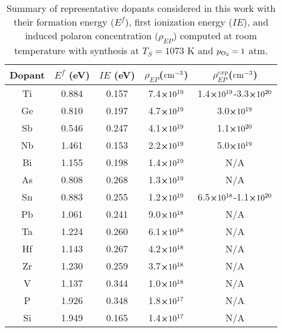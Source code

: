  \begin{table}[h]
\footnotesize
\centering
\begin{tabular}{c|cccc}
\hline \hline
Dopant & $E^f$ (eV) &  $IE$ (eV) &  $\rho_{EP}$(${\rm cm}^{-3}$) &  $\rho_{EP}^{exp}$(${\rm cm}^{-3}$)  \\
\hline
Ti &        0.884 &           0.157 &        7.4$\cross 10^{19}$ &  1.4$\cross 10^{19}$-3.3$\cross 10^{20}$ \cite{wang2011facile,rioult2014single,malviya2017influence,hahn2010photoelectrochemical,zandi2013highly,glasscock2007enhancement}\\
Ge &        0.810 &           0.197 &        4.7$\cross 10^{19}$ &  3.0$\cross 10^{19}$ \cite{liu2014highly}\\
Sb &        0.546 &           0.247 &        4.1$\cross 10^{19}$ &  1.1$\cross 10^{20}$ \cite{annamalai2018influence}\\
Nb &        1.461 &           0.153 &        2.2$\cross 10^{19}$ &  5.0$\cross 10^{19}$ \cite{sanchez1988photoelectrochemistry} \\
Bi &        1.155 &           0.198 &        1.4$\cross 10^{19}$ &  N/A\\
As &        0.808 &           0.268 &        1.3$\cross 10^{19}$ &  N/A\\
Sn &        0.883 &           0.255 &        1.2$\cross 10^{19}$ &  6.5$\cross 10^{18}$-1.1$\cross 10^{20}$ \cite{li2017morphology,tian2020electronic,ling2011sn,yang2016acid}\\
Pb &        1.061 &           0.241 &        9.0$\cross 10^{18}$ &  N/A\\
Ta &        1.224 &           0.260 &        6.1$\cross 10^{18}$ &  N/A\\
Hf &        1.143 &           0.267 &        4.2$\cross 10^{18}$ &  N/A\\
Zr &        1.230 &           0.259 &        3.7$\cross 10^{18}$ &  N/A\\
V &        1.137 &           0.344 &        1.0$\cross 10^{18}$ &  N/A\\
P &        1.926 &           0.348 &        1.8$\cross 10^{17}$ &  N/A\\
Si &        1.949 &           0.165 &        1.4$\cross 10^{17}$ &  N/A\\
\hline \hline
\end{tabular}
\caption{Summary of representative dopants considered in this work with their formation energy ($E^f$), first ionization energy ($IE$), and induced polaron concentration ($\rho_{EP}$) computed at room temperature with synthesis at $T_S=1073$ K and $p_{\rm O_2}=1$ atm.
}
\label{table:summary}
\end{table}



